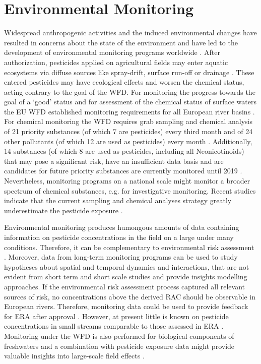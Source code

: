 \section{Environmental Monitoring}

Widespread anthropogenic activities and the induced environmental changes have resulted in concerns about the state of the environment and have led to the development of environmental monitoring programs worldwide \citep{nichols_monitoring_2006}. 
After authorization, pesticides applied on agricultural fields may enter aquatic ecosystems via diffuse sources like spray-drift, surface run-off or drainage \citep{schulz_field_2004, stehle_probabilistic_2013, liess_determination_1999}. 
These entered pesticides may have ecological effects and worsen the chemical status, acting contrary to the goal of the WFD. 
For monitoring the progress towards the goal of a `good' status and for assessment of the chemical status of surface waters the EU WFD established monitoring requirements for all European river basins \citep{european_union_directive_2000}. 
For chemical monitoring the WFD requires grab sampling and chemical analysis of 21 priority substances (of which 7 are pesticides) every third month and of 24 other pollutants (of which 12 are used as pesticides) every month \citep{european_union_directive_2013}. 
Additionally, 14 substances (of which 8 are used as pesticides, including all Neonicotinoids) that may pose a significant risk, have an insufficient data basis and are candidates for future priority substances are currently monitored until 2019 \citep{european_union_commission_2015}.
Nevertheless, monitoring programs on a national scale might monitor a broader spectrum of chemical substances, e.g. for investigative monitoring. 
Recent studies indicate that the current sampling and chemical analyses strategy greatly underestimate the pesticide exposure \citep{stehle_probabilistic_2013, xing_influences_2013, moschet_how_2014}. 

Environmental monitoring produces humongous amounts of data containing information on pesticide concentrations in the field on a large under many conditions.
Therefore, it can be complementary to environmental risk assessment \citep{suter_ecological_2007}. 
Moreover, data from long-term monitoring programs can be used to study hypotheses about spatial and temporal dynamics and interactions, that are not evident from short term and short scale studies \citep{gitzen_design_2012} and provide insights modelling approaches. 
If the environmental risk assessment process captured all relevant sources of risk, no concentrations above the derived RAC should be observable in European rivers. 
Therefore, monitoring data could be used to provide feedback for ERA after approval \citep{knauer_pesticides_2016}. 
However, at present little is known on pesticide concentrations in small streams comparable to those assessed in ERA \citep{lorenz_specifics_2016, biggs_importance_2016}. 
Monitoring under the WFD is also performed for biological components of freshwaters and a combination with pesticide exposure data might provide valuable insights into large-scale field effects \citep{schipper_deriving_2014}.


